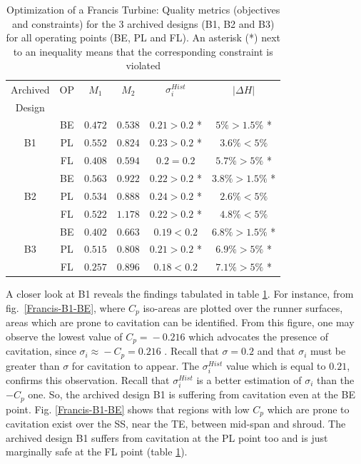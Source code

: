 \begin{table}[h!]
\begin{center}
\begin{tabular}{ |c|c|c|c|c|c| }
\hline
Archived & OP & $M_1$ & $M_2$  & $\sigma_i^{Hist}$ & $|\Delta H|$\\
Design &&&&&\\
\hline
 & BE & $0.472$ & $0.538$ & $0.21 > 0.2$ * & $ 5\% >1.5\%$ * \\
B1 & PL & $0.552$ & $0.824$ & $0.23 > 0.2$ * & $ 3.6\% <5\%$ \\
& FL & $0.408$ & $0.594$ & $0.2 = 0.2$  & $ 5.7\% >5\%$ * \\
\hline
\hline
& BE & $0.563$ & $0.922$ & $0.22 > 0.2$ * & $ 3.8\% >1.5\%$ * \\
B2 & PL & $0.534$ & $0.888$ & $0.24 > 0.2$ * & $ 2.6\% <5\%$  \\
& FL & $0.522$ & $1.178$ & $0.22 > 0.2$ * & $ 4.8\% <5\%$  \\
\hline
\hline
& BE & $0.402$ & $0.663$ & $0.19 < 0.2$  & $ 6.8\% >1.5\%$ * \\
B3 & PL & $0.515$ & $0.808$ & $0.21 > 0.2$ * & $ 6.9\% >5\%$ * \\
& FL & $0.257$ & $0.896$ & $0.18 < 0.2$  & $ 7.1\% >5\%$ * \\
\hline
\end{tabular}
\caption{Optimization of a Francis Turbine: Quality metrics (objectives and constraints) for the 3 archived designs (B1, B2 and B3) for all operating points (BE, PL and FL). An asterisk (*) next to an inequality means that the corresponding constraint is violated}
\label{reuse}
\end{center}
\end{table}

A closer look at B1 reveals the findings tabulated in table \ref{reuse}. For instance, from fig.\ \ref{Francis-B1-BE}, where $C_p$ iso-areas are plotted over the runner surfaces, areas which are prone to cavitation can be identified. From this figure, one may observe the lowest value of $C_p \!= \!-0.216$ which advocates the presence of cavitation, since $\sigma_i \! \approx \! -C_p \!= \!0.216$  . Recall that $\sigma \! = \! 0.2$ and that $\sigma_i$ must be greater than $\sigma$ for cavitation to appear. The $\sigma_i^{Hist}$ value which is equal to $0.21$, confirms this observation. Recall that $\sigma_i^{Hist}$ is a better estimation of $\sigma_i$ than the $-C_p$ one. So, the archived design B1 is suffering from cavitation even at the BE point. Fig. \ref{Francis-B1-BE} shows that regions with low $C_p$ which are prone to cavitation exist over the SS, near the TE, between mid-span and shroud. The archived design B1 suffers from cavitation at the PL point too and is just marginally safe at the FL  point (table \ref{reuse}). 

